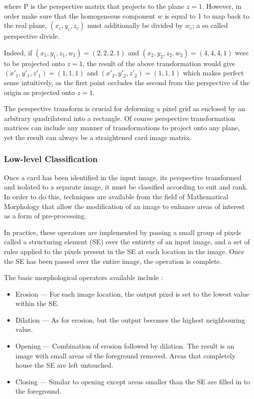 \documentclass[a4paper,12pt,notitlepage]{article}
\begin{document}
			where P is the perspective matrix that projects to the plane $z = 1$. However, in order make sure that the homogeneous component $w$ is equal to 1 to map back to the real plane, $(x_c, y_c, z_c)$ must additionally be divided by $w_c$; a so called perspective divide.

			Indeed, if $(x_1, y_1, z_1, w_1) = (2, 2, 2, 1)$ and $(x_2, y_2, z_2, w_2) = (4, 4, 4, 1)$ were to be projected onto $z = 1$, the result of the above transformation would give $(x'_1, y'_1, z'_1) = (1, 1, 1)$ and $(x'_2, y'_2, z'_2) = (1, 1, 1)$ which makes perfect sense intuitively, as the first point occludes the second from the perspective of the origin as projected onto $z = 1$.

			The perspective transform is crucial for deforming a pixel grid as enclosed by an arbitrary quadrilateral into a rectangle. Of course perspective transformation matrices can include any manner of transformations to project onto any plane, yet the result can always be a straightened card image matrix.
		\subsubsection{Low-level Classification}
			Once a card has been identified in the input image, its perspective transformed and isolated to a separate image, it must be classified according to suit and rank. In order to do this, techniques are available from the field of Mathematical Morphology that allow the modification of an image to enhance areas of interest as a form of pre-processing.

			In practice, these operators are implemented by passing a small group of pixels called a structuring element (SE) over the entirety of an input image, and a set of rules applied to the pixels present in the SE at each location in the image. Once the SE has been passed over the entire image, the operation is complete.

			The basic morphological operators available include \autocite{sonka1999image1}:

			\begin{itemize}
				\item Erosion --- For each image location, the output pixel is set to the lowest value within the SE.
				\item Dilation --- As for erosion, but the output becomes the highest neighbouring value. 
				\item Opening --- Combination of erosion followed by dilation. The result is an image with small areas of the foreground removed. Areas that completely house the SE are left untouched.
				\item Closing --- Similar to opening except areas smaller than the SE are filled in to the foreground.
			\end{itemize}
\end{document}
